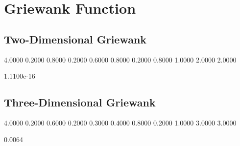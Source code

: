 \section{Griewank Function}

\subsection{Two-Dimensional Griewank}

4.0000    0.2000    0.8000    0.2000    0.6000    0.8000    0.2000    0.8000    1.0000    2.0000    2.0000

1.1100e-16

\subsection{Three-Dimensional Griewank}

4.0000    0.2000    0.6000    0.2000    0.3000    0.4000    0.8000    0.2000    1.0000    3.0000    3.0000

0.0064
